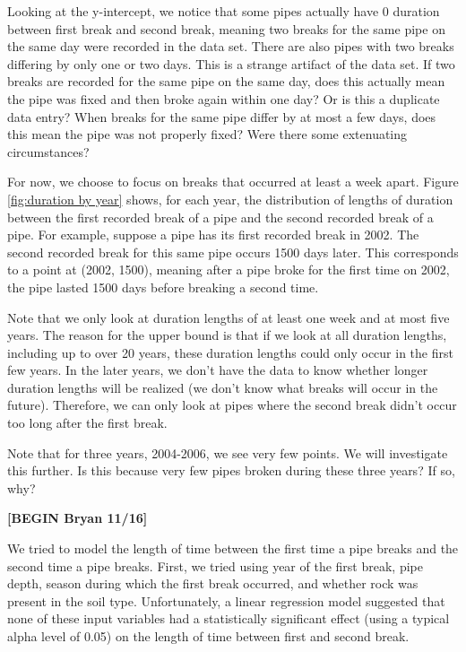 \documentclass[twocolumn]{article}
\begin{document}
Looking at the y-intercept, we notice that some pipes actually have 0 duration between first break and second break, meaning two breaks for the same pipe on the same day were recorded in the data set. There are also pipes with two breaks differing by only one or two days. This is a strange artifact of the data set. If two breaks are recorded for the same pipe on the same day, does this actually mean the pipe was fixed and then broke again within one day? Or is this a duplicate data entry? When breaks for the same pipe differ by at most a few days, does this mean the pipe was not properly fixed? Were there some extenuating circumstances?

For now, we choose to focus on breaks that occurred at least a week apart. Figure \ref{fig:duration by year} shows, for each year, the distribution of lengths of duration between the first recorded break of a pipe and the second recorded break of a pipe. For example, suppose a pipe has its first recorded break in 2002. The second recorded break for this same pipe occurs 1500 days later. This corresponds to a point at (2002, 1500), meaning after a pipe broke for the first time on 2002, the pipe lasted 1500 days before breaking a second time. 

Note that we only look at duration lengths of at least one week and at most five years. The reason for the upper bound is that if we look at all duration lengths, including up to over 20 years, these duration lengths could only occur in the first few years. In the later years, we don't have the data to know whether longer duration lengths will be realized (we don't know what breaks will occur in the future). Therefore, we can only look at pipes where the second break didn't occur too long after the first break.

Note that for three years, 2004-2006, we see very few points. We will investigate this further. Is this because very few pipes broken during these three years? If so, why? 

\textbf{[BEGIN Bryan 11/16]}

We tried to model the length of time between the first time a pipe breaks and the second time a pipe breaks. First, we tried using year of the first break, pipe depth, season during which the first break occurred, and whether rock was present in the soil type. Unfortunately, a linear regression model suggested that none of these input variables had a statistically significant effect (using a typical alpha level of 0.05) on the length of time between first and second break. 
\end{document}
